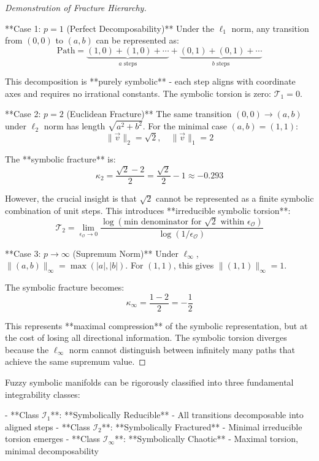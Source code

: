 \begin{proof}[Demonstration of Fracture Hierarchy]
\label{proof:bk5_lp_norm_fracture_hierarchy}

**Case 1: $p = 1$ (Perfect Decomposability)**
Under the $\ell_1$ norm, any transition from $(0,0)$ to $(a,b)$ can be represented as:
$$\text{Path} = \underbrace{(1,0) + (1,0) + \cdots}_{a \text{ steps}} + \underbrace{(0,1) + (0,1) + \cdots}_{b \text{ steps}}$$

This decomposition is **purely symbolic** - each step aligns with coordinate axes and requires no irrational constants. The symbolic torsion is zero: $\mathcal{T}_1 = 0$.

**Case 2: $p = 2$ (Euclidean Fracture)**
The same transition $(0,0) \to (a,b)$ under $\ell_2$ norm has length $\sqrt{a^2 + b^2}$. For the minimal case $(a,b) = (1,1)$:
$$\|\vec{v}\|_2 = \sqrt{2}, \quad \|\vec{v}\|_1 = 2$$

The **symbolic fracture** is:
$$\kappa_2 = \frac{\sqrt{2} - 2}{2} = \frac{\sqrt{2}}{2} - 1 \approx -0.293$$

However, the crucial insight is that $\sqrt{2}$ cannot be represented as a finite symbolic combination of unit steps. This introduces **irreducible symbolic torsion**:
$$\mathcal{T}_2 = \lim_{\epsilon_\mathcal{O} \to 0} \frac{\log(\text{min denominator for } \sqrt{2} \text{ within } \epsilon_\mathcal{O})}{\log(1/\epsilon_\mathcal{O})}$$

**Case 3: $p \to \infty$ (Supremum Norm)**
Under $\ell_\infty$, $\|(a,b)\|_\infty = \max(|a|, |b|)$. For $(1,1)$, this gives $\|(1,1)\|_\infty = 1$.

The symbolic fracture becomes:
$$\kappa_\infty = \frac{1 - 2}{2} = -\frac{1}{2}$$

This represents **maximal compression** of the symbolic representation, but at the cost of losing all directional information. The symbolic torsion diverges because the $\ell_\infty$ norm cannot distinguish between infinitely many paths that achieve the same supremum value.
\end{proof}

\begin{proposition}
\label{prop:bk5_symbolic_integrability_classes}
Fuzzy symbolic manifolds can be rigorously classified into three fundamental integrability classes:

- **Class $\mathcal{I}_1$**: **Symbolically Reducible** - All transitions decomposable into aligned steps
- **Class $\mathcal{I}_2$**: **Symbolically Fractured** - Minimal irreducible torsion emerges
- **Class $\mathcal{I}_\infty$**: **Symbolically Chaotic** - Maximal torsion, minimal decomposability
\end{proposition}

